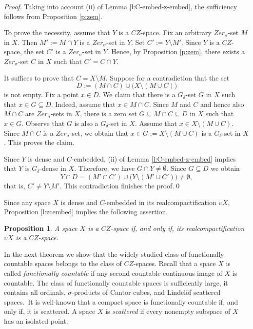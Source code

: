 \documentclass[preprint,11pt]{elsarticle}
\newtheorem{proposition}[theorem]{Proposition}
\numberwithin{equation}{section}
\numberwithin{theorem}{section}
\begin{document}
\begin{proof}
Taking into account (ii) of Lemma \ref{l:C-embed-z-embed}, the sufficiency follows from Proposition \ref{p:zem}.
\smallskip

To prove the necessity, assume that $Y$ is a $CZ$-space. Fix an arbitrary $Zer_{\sigma}$-set  $M$ in $X$. Then $M':=M\cap Y$ is a $Zer_{\sigma}$-set in $Y$. Set $C':=Y\setminus M'$. Since $Y$ is a $CZ$-space, the set $C'$ is a $Zer_{\sigma}$-set in $Y$. Hence, by Proposition \ref{p:zem},  there exists a $Zer_{\sigma}$-set $C$ in $X$ such that $C'=C\cap Y$.

It suffices to prove that $C=X\setminus M$. Suppose for a contradiction that the set
\[
D:=(M\cap C)\cup \big(X\setminus (M\cup C)\big)
\]
is not empty. Fix a point $x\in D$. We claim that there is a $G_\delta$-set $G$ in $X$ such that $x\in G\subseteq D$. Indeed, assume that $x\in M\cap C$. Since $M$ and $C$ and hence also $M\cap C$ are $Zer_{\sigma}$-sets in $X$, there is a zero set $G\subseteq M\cap C\subseteq D$ in $X$ such that $x\in G$. Observe that $G$ is also a $G_\delta$-set in $X$. Assume that $x\in X\setminus (M\cup C)$. Since $M\cap C$ is a  $Zer_{\sigma}$-set, we obtain that $x\in G:=X\setminus (M\cup C)$ is a $G_\delta$-set in $X$. This proves the claim.

Since $Y$ is dense and $C$-embedded, (ii) of Lemma \ref{l:C-embed-z-embed} implies that $Y$ is $G_\delta$-dense in $X$. Therefore,  we have $G\cap Y\neq\emptyset$. Since $G\subseteq D$ we obtain
\[
Y\cap D=(M'\cap C')\cup \big(Y\setminus (M'\cup C')\big)\neq\emptyset,
\]
that is, $C'\neq Y\setminus M'$. This contradiction finishes the proof.\qed
\end{proof}

Since any space $X$ is dense and $C$-embedded in its realcompactification $\upsilon X$, Proposition \ref{l:zcembed} implies the following assertion.

\begin{proposition}\label{p:cz-nu}
A space $X$ is a $CZ$-space if, and only if,  its realcompactification $\upsilon X$ is a $CZ$-space.
\end{proposition}


In the next theorem we show that the widely studied class of functionally countable spaces belongs to the class of $CZ$-spaces. Recall that a space $X$ is called {\em functionally countable} if  any second countable continuous image of $X$ is countable. The class of functionally countable spaces is sufficiently large, it contains all ordinals, $\sigma$-products of Cantor cubes, and Lindel\"{o}f scattered spaces. It is well-known that a compact space is functionally countable if, and only if, it is scattered.  A space $X$ is {\em scattered} if every nonempty subspace of $X$ has an isolated point.
\end{document}

